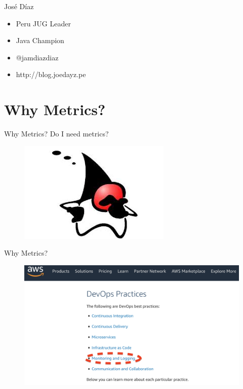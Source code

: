 \documentclass{beamer}
\begin{document}
\begin{frame}{José Díaz}

		\begin{itemize}
			\item Peru JUG Leader
			\item Java Champion
			\item @jamdiazdiaz
			\item http://blog.joedayz.pe
		\end{itemize}


\end{frame}

\section{Why Metrics?}
\begin{frame}{Why Metrics?}
\Large Do I need metrics?
\begin{figure}
	\centering
	\includegraphics[width=0.6\linewidth]{Images/dukewhy}
\end{figure}
\end{frame}


\begin{frame}{Why Metrics?}

\begin{figure}
	\centering
	\includegraphics[width=\linewidth]{Images/amazondevops}
\end{figure}
\end{frame}
\end{document}
